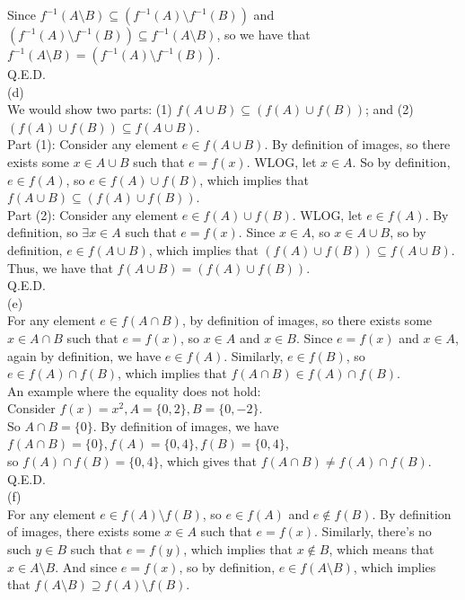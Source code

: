 \documentclass{article}
\begin{document}
\indent Since $f^{-1}(A\setminus B)\subseteq(f^{-1}(A)\setminus f^{-1}(B))$ and $(f^{-1}(A)\setminus f^{-1}(B))\subseteq f^{-1}(A\setminus B)$, so we have that $f^{-1}(A\setminus B) = (f^{-1}(A)\setminus f^{-1}(B))$.\\[.15cm]
\indent Q.E.D.\\[.3cm]
(d) \\[.15cm]
\indent We would show two parts: (1) $f(A\cup B)\subseteq(f(A)\cup f(B))$; and (2) $(f(A)\cup f(B))\subseteq f(A\cup B)$.\\[.1cm]
\indent Part (1): Consider any element $e\in f(A\cup B)$. By definition of images, so there exists some $x\in A\cup B$ such that $e = f(x)$. WLOG, let $x\in A$. So by definition, $e\in f(A)$, so $e\in f(A)\cup f(B)$, which implies that $f(A\cup B)\subseteq(f(A)\cup f(B))$. \\[.1cm]
\indent Part (2): Consider any element $e\in f(A)\cup f(B)$. WLOG, let $e\in f(A)$. By definition, so $\exists x\in A$ such that $e = f(x)$. Since $x\in A$, so $x\in A\cup B$, so by definition, $e\in f(A\cup B)$, which implies that $(f(A)\cup f(B))\subseteq f(A\cup B)$. \\[.1cm]
\indent Thus, we have that $f(A\cup B) = (f(A)\cup f(B))$.\\[.15cm]
\indent Q.E.D.\\[.3cm]
(e) \\[.15cm]
\indent For any element $e\in f(A\cap B)$, by definition of images, so there exists some $x\in A\cap B$ such that $e = f(x)$, so $x\in A$ and $x\in B$. Since $e = f(x)$ and $x\in A$, again by definition, we have $e\in f(A)$. Similarly, $e\in f(B)$, so $e\in f(A)\cap f(B)$, which implies that $f(A\cap B)\in f(A)\cap f(B)$.\\[.15cm]
\indent An example where the equality does not hold:\\[.1cm]
\indent\indent Consider $f(x) = x^2, A = \{0, 2\}, B = \{0, -2\}$.\\[.1cm]
\indent\indent So $A\cap B = \{0\}$. By definition of images, we have $f(A\cap B) = \{0\}, f(A) = \{0, 4\}, f(B) = \{0, 4\}$,\\
\indent\indent so $f(A)\cap f(B) = \{0, 4\}$, which gives that $f(A\cap B)\ne f(A)\cap f(B)$.\\[.15cm]
\indent Q.E.D.\\[.3cm]
(f) \\[.15cm]
\indent For any element $e\in f(A)\setminus f(B)$, so $e\in f(A)$ and $e\notin f(B)$. By definition of images, there exists some $x\in A$ such that $e = f(x)$. Similarly, there's no such $y\in B$ such that $e = f(y)$, which implies that $x\notin B$, which means that $x\in A\setminus B$. And since $e = f(x)$, so by definition, $e\in f(A\setminus B)$, which implies that $f(A\setminus B)\supseteq f(A)\setminus f(B)$.
\end{document}
